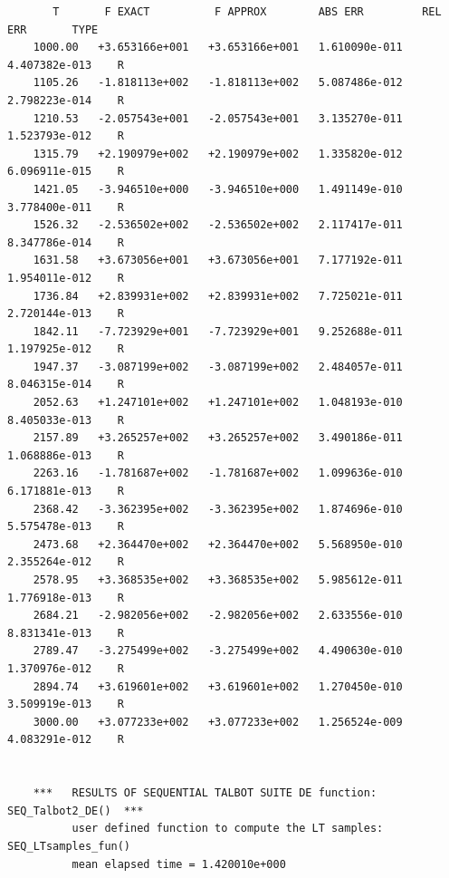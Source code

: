 \documentclass[a4paper,10pt]{report}%
\begin{document}
\begin{lstlisting}
       T       F EXACT          F APPROX        ABS ERR         REL ERR       TYPE
    1000.00   +3.653166e+001   +3.653166e+001   1.610090e-011   4.407382e-013    R
    1105.26   -1.818113e+002   -1.818113e+002   5.087486e-012   2.798223e-014    R
    1210.53   -2.057543e+001   -2.057543e+001   3.135270e-011   1.523793e-012    R
    1315.79   +2.190979e+002   +2.190979e+002   1.335820e-012   6.096911e-015    R
    1421.05   -3.946510e+000   -3.946510e+000   1.491149e-010   3.778400e-011    R
    1526.32   -2.536502e+002   -2.536502e+002   2.117417e-011   8.347786e-014    R
    1631.58   +3.673056e+001   +3.673056e+001   7.177192e-011   1.954011e-012    R
    1736.84   +2.839931e+002   +2.839931e+002   7.725021e-011   2.720144e-013    R
    1842.11   -7.723929e+001   -7.723929e+001   9.252688e-011   1.197925e-012    R
    1947.37   -3.087199e+002   -3.087199e+002   2.484057e-011   8.046315e-014    R
    2052.63   +1.247101e+002   +1.247101e+002   1.048193e-010   8.405033e-013    R
    2157.89   +3.265257e+002   +3.265257e+002   3.490186e-011   1.068886e-013    R
    2263.16   -1.781687e+002   -1.781687e+002   1.099636e-010   6.171881e-013    R
    2368.42   -3.362395e+002   -3.362395e+002   1.874696e-010   5.575478e-013    R
    2473.68   +2.364470e+002   +2.364470e+002   5.568950e-010   2.355264e-012    R
    2578.95   +3.368535e+002   +3.368535e+002   5.985612e-011   1.776918e-013    R
    2684.21   -2.982056e+002   -2.982056e+002   2.633556e-010   8.831341e-013    R
    2789.47   -3.275499e+002   -3.275499e+002   4.490630e-010   1.370976e-012    R
    2894.74   +3.619601e+002   +3.619601e+002   1.270450e-010   3.509919e-013    R
    3000.00   +3.077233e+002   +3.077233e+002   1.256524e-009   4.083291e-012    R


    ***   RESULTS OF SEQUENTIAL TALBOT SUITE DE function:  SEQ_Talbot2_DE()  ***
          user defined function to compute the LT samples:  SEQ_LTsamples_fun()
          mean elapsed time = 1.420010e+000


\end{lstlisting}
\end{document}
